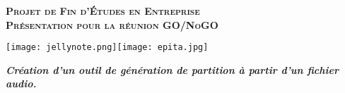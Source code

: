 \begin{titlepage}



	\begin{center}

		{
			\Huge
				\textsc{
					\textbf{
						Projet de Fin d'Études en Entreprise \\
					}
				}
		}
		{
			\LARGE
				\textsc{
					\textbf{
						Présentation pour la réunion GO/NoGO \\
					}
				}
		}

		{
				\texttt{[image: jellynote.png]}\hspace{3cm}\texttt{[image: epita.jpg]}\\
				[1cm]
		}

		\textbf{
			\textit {
				Création d'un outil de génération de partition à partir d'un fichier audio.\\
				[1cm]
			}
		}
	\end{center}
\end{titlepage}